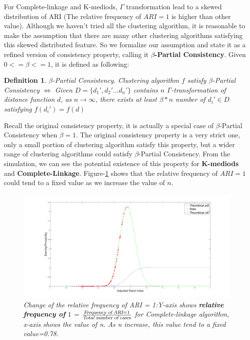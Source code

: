 \documentclass{uonmathreport}
\newtheorem{definition}{Definition}[section]
\begin{document}
For Complete-linkage and K-mediods, $\Gamma$ transformation lead to a skewed distribution of ARI (The relative frequency of $ARI =1$ is higher than other value). Although we haven't tried all the clustering algorithm, it is reasonable to make the assumption that there are many other clustering algorithms satisfying this skewed distributed feature. So we formalize our assumption and state it as a refined version of consistency property, calling it \textbf{$\beta$-Partial Consistency}. 
Given $0<=\beta<=1$, it is defined as following:
\begin{definition}
$\beta $-Partial Consistency. Clustering algorithm $f$ satisfy $\beta$-Partial Consistency $\iff$ Given $D=\{d_1',d_2'\ldots d_n'\}$ contains $n$ $\Gamma$-transformation of distance function $d$, as $n\rightarrow \infty$, there exists at least $\beta *n$ number of $d_i'\in D$ satisfying $f(d_i')=f(d)$ 
\end{definition}
Recall the original consistency property, it is actually a special case of $\beta $-Partial Consistency when $\beta = 1$. The original consistency property is a very strict one, only a small portion of clustering algorithm satisfy this property, but a wider range of clustering algorithms could satisfy $\beta$-Partial Consistency. From the simulation, we can see the potential existence of this property for \textbf{K-mediods} and \textbf{Complete-Linkage}. Figure-\ref{fig:single-linkage4} shows that the relative frequency of $ARI=1$ could tend to a fixed value as we increase the value of $n$.

\begin{figure}[H]
 \begin{center}
   \includegraphics[width=1\textwidth]{Complete-linkage-cdf.png}
 \end{center}
 \caption{\textit{Change of the relative frequency of ARI = 1:Y-axis shows \textbf{relative frequency of} $1$ = $\frac{\textsl{Frequency of ARI}=1}{\textsl{Total number of cases}} $ for Complete-linkage algorithm, x-axis shows the value of n. As n increase, this value tend to a fixed value=0.78.}}
 \label{fig:single-linkage4}
\end{figure}
\end{document}
